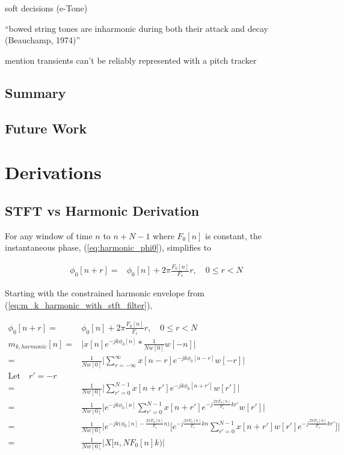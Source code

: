 \documentclass [11pt, proquest,oneside] {ganter_thesis}[2015/03/03]
\begin{document}
soft decisions (e-Tone)

``bowed string tones are inharmonic during both their attack and decay (Beauchamp, 1974)''

mention transients can't be reliably represented with a pitch tracker

\section{Summary}

\section{Future Work}


%
%
\nocite{*}   %


%
%
\appendix
\raggedbottom\sloppy
 

\chapter{Derivations}

\section{STFT vs Harmonic Derivation}\label{section:stft_vs_harmonic_derivation}

For any window of time $n$ to $n + N - 1$ where $F_0[n]$ is constant, the instantaneous phase, (\ref{eq:harmonic_phi0}), simplifies to

\begin{align}
\phi_0[n + r] =& \phi_0[n] + 2\pi \frac{F_0[n]}{F_s}r, \quad 0 \leq r < N
\end{align}

Starting with the constrained harmonic envelope from (\ref{eq:m_k_harmonic_with_stft_filter}), 

\begin{align}
\phi_0[n + r] =& \phi_0[n] + 2\pi \frac{F_0[n]}{F_s}r, \quad 0 \leq r < N \\
m_{k,harmonic}[n] =& \Bigg| x[n] e^{-jk\phi_0 [n]} *  \frac{1}{Nw[0]} w[-n] \Bigg| \nonumber \\
=& \frac{1}{Nw[0]} \Bigg| \sum_{r = -\infty}^\infty x[n - r] e^{-jk\phi_0 [n-r]} w[-r] \Bigg| \nonumber \\
\textrm{Let} \quad r' = -r \nonumber \\
=& \frac{1}{Nw[0]} \Bigg| \sum_{r' = 0}^{N-1} x[n + r'] e^{-jk\phi_0 [n + r']} w[r'] \Bigg|  \nonumber \\
=& \frac{1}{Nw[0]} \Bigg| e^{-jk \phi_0[n]} \sum_{r' = 0}^{N-1} x[n + r'] e^{-j \frac{2\pi F_0[n]}{F_s}kr'} w[r'] \Bigg| \nonumber \\
=& \frac{1}{Nw[0]} \Bigg| e^{-jk \Big(\phi_0[n] - \frac{2\pi F_0[n]}{F_s}n \Big)} \Bigg[ e^{-j \frac{2\pi F_0[n]}{F_s}kn} \sum_{r' = 0}^{N-1} x[n + r'] w[r'] e^{-j \frac{2\pi F_0[n]}{F_s}kr'} \Bigg] \Bigg| \nonumber \\
=& \frac{1}{Nw[0]} \Bigg| X\Big[n, N F_0[n] k \Big) \Bigg| \nonumber
\end{align}
\end{document}
